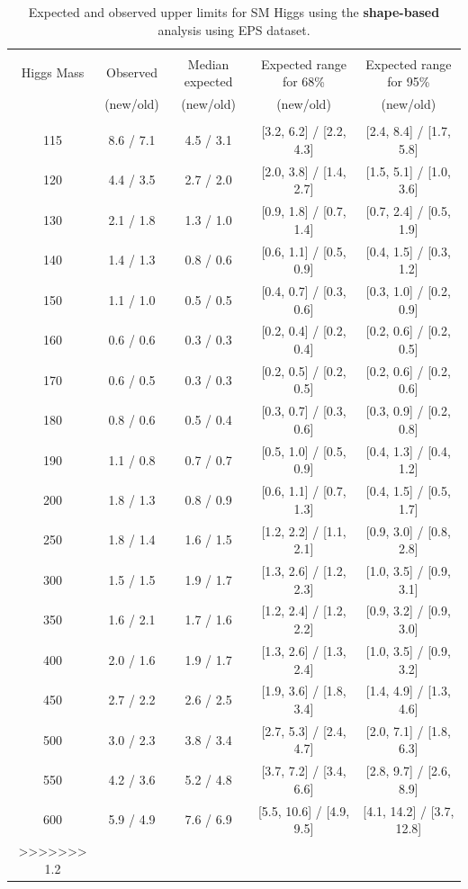 \begin{table}[hbp!]
\begin{center}
\begin{tabular}{c c c c c}
\hline
\vspace{-3mm} && \\
 Higgs Mass   & Observed & Median expected & Expected range for 68\% & Expected range for 95\%   \\
  & (new/old) & (new/old) & (new/old) & (new/old)   \\
\vspace{-3mm} && \\
\hline
115 & 8.6 / 7.1 & 4.5 / 3.1 & [3.2, 6.2] / [2.2, 4.3]& [2.4, 8.4] / [1.7, 5.8] \\
120 & 4.4 / 3.5 & 2.7 / 2.0 & [2.0, 3.8] / [1.4, 2.7]& [1.5, 5.1] / [1.0, 3.6] \\
130 & 2.1 / 1.8 & 1.3 / 1.0 & [0.9, 1.8] / [0.7, 1.4]& [0.7, 2.4] / [0.5, 1.9] \\
140 & 1.4 / 1.3 & 0.8 / 0.6 & [0.6, 1.1] / [0.5, 0.9]& [0.4, 1.5] / [0.3, 1.2] \\
150 & 1.1 / 1.0 & 0.5 / 0.5 & [0.4, 0.7] / [0.3, 0.6]& [0.3, 1.0] / [0.2, 0.9] \\
160 & 0.6 / 0.6 & 0.3 / 0.3 & [0.2, 0.4] / [0.2, 0.4]& [0.2, 0.6] / [0.2, 0.5] \\
170 & 0.6 / 0.5 & 0.3 / 0.3 & [0.2, 0.5] / [0.2, 0.5]& [0.2, 0.6] / [0.2, 0.6] \\
180 & 0.8 / 0.6 & 0.5 / 0.4 & [0.3, 0.7] / [0.3, 0.6]& [0.3, 0.9] / [0.2, 0.8] \\
190 & 1.1 / 0.8 & 0.7 / 0.7 & [0.5, 1.0] / [0.5, 0.9]& [0.4, 1.3] / [0.4, 1.2] \\
200 & 1.8 / 1.3 & 0.8 / 0.9 & [0.6, 1.1] / [0.7, 1.3]& [0.4, 1.5] / [0.5, 1.7] \\
250 & 1.8 / 1.4 & 1.6 / 1.5 & [1.2, 2.2] / [1.1, 2.1]& [0.9, 3.0] / [0.8, 2.8] \\
300 & 1.5 / 1.5 & 1.9 / 1.7 & [1.3, 2.6] / [1.2, 2.3]& [1.0, 3.5] / [0.9, 3.1] \\
350 & 1.6 / 2.1 & 1.7 / 1.6 & [1.2, 2.4] / [1.2, 2.2]& [0.9, 3.2] / [0.9, 3.0] \\
400 & 2.0 / 1.6 & 1.9 / 1.7 & [1.3, 2.6] / [1.3, 2.4]& [1.0, 3.5] / [0.9, 3.2] \\
450 & 2.7 / 2.2 & 2.6 / 2.5 & [1.9, 3.6] / [1.8, 3.4]& [1.4, 4.9] / [1.3, 4.6] \\
500 & 3.0 / 2.3 & 3.8 / 3.4 & [2.7, 5.3] / [2.4, 4.7]& [2.0, 7.1] / [1.8, 6.3] \\
550 & 4.2 / 3.6 & 5.2 / 4.8 & [3.7, 7.2] / [3.4, 6.6]& [2.8, 9.7] / [2.6, 8.9] \\
600 & 5.9 / 4.9 & 7.6 / 6.9 & [5.5, 10.6] / [4.9, 9.5]& [4.1, 14.2] / [3.7, 12.8]\\

>>>>>>> 1.2
\hline
\end{tabular}
\caption{Expected and observed upper limits for SM Higgs using the
  {\bf shape-based} analysis using EPS dataset.}
\label{tab:mvabase_uls_eps}
\end{center}
\end{table}

